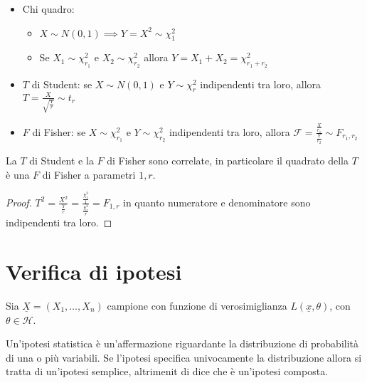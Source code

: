 \documentclass[hidelinks, 10pt]{report}
\begin{document}
\begin{defn}
\noindent
\begin{itemize}
\item Chi quadro: 
\begin{itemize}
\item $ X \sim N(0,1) \implies Y = X^2 \sim \chi^2_{1} $
\item Se $ X_1 \sim \chi^{2}_{r_1} $ e $ X_2 \sim \chi^{2}_{r_2} $ allora $ Y = X_1 + X_2 = \chi^{2}_{r_1 + r_2} $
\end{itemize}
\item $ T $ di Student: se $ X \sim N(0,1) $ e $ Y \sim \chi^{2}_{r} $ indipendenti tra loro, allora $ T = \frac{X}{\sqrt{\frac{Y}{r}}} \sim t_{r} $
\item $ F $ di Fisher: se $ X \sim \chi^{2}_{r_1} $ e $ Y \sim \chi^{2}_{r_2} $ indipendenti tra loro, allora $ \mathcal{F} = \frac{\frac{X}{r_1}}{\frac{Y}{r_2}} \sim F_{r_1, r_2} $
\end{itemize}
\end{defn}

\begin{oss}
La $ T $ di Student e la $ F $ di Fisher sono correlate, in particolare il quadrato della $ T $ \`e una $ F $ di Fisher a parametri $ 1, r $.

\begin{proof}
$ T^{2} = \frac{X^2}{\frac{Y}{r}} = \frac{\frac{\chi^{2}_{1}}{1}}{\frac{\chi^{2}_{r}}{r}} = F_{1, r} $ in quanto numeratore e denominatore sono indipendenti tra loro.
\end{proof}
\end{oss}

\section{Verifica di ipotesi}
Sia $ \underline{X} = (X_1, \dotsc, X_n) $ campione con funzione di verosimiglianza $ L(\underline{x}, \theta) $, con $ \theta \in \mathcal{H} $.
 
\begin{defn}
Un'ipotesi statistica \`e un'affermazione riguardante la distribuzione di probabilit\`a di una o pi\`u variabili. Se l'ipotesi specifica univocamente la distribuzione allora si tratta di un'ipotesi semplice, altrimenit di dice che \`e un'ipotesi composta.
\end{defn}
\end{document}
